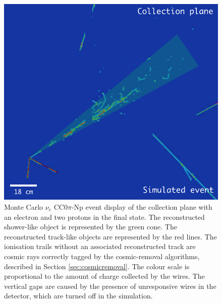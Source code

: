 \begin{figure}[htbp]
	\begin{center}
    	\includegraphics[width=0.85\linewidth]{figures/evd.png}
    	\caption{Monte Carlo $\nu_{e}$ CC0$\pi$-Np event display of the collection plane with an electron and two protons in the final state. The reconstructed shower-like object is represented by the green cone. The reconstructed track-like objects are represented by the red lines. The ionisation trails without an associated reconstructed track are cosmic rays correctly tagged by the cosmic-removal algorithms, described in Section \ref{sec:cosmicremoval}. The colour scale is proportional to the amount of charge collected by the wires. {The vertical gaps are caused by the presence of unresponsive wires in the detector, which are turned off in the simulation.}} \label{fig:evd}
	\end{center}
\end{figure}


